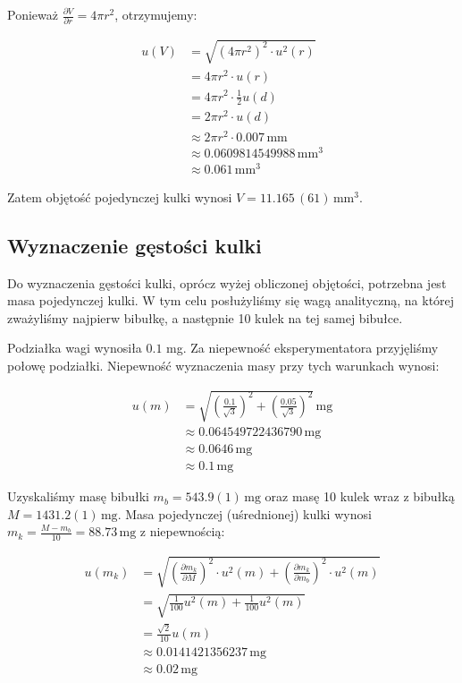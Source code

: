 \documentclass[a4paper]{article}
\begin{document}
Ponieważ $\frac{\partial V}{\partial r} = 4 \pi r^2$, otrzymujemy:

\begin{align*}
	u(V) &= \sqrt{\left(4 \pi r^2\right)^2 \cdot u^2(r)} \\
	&= 4 \pi r^2 \cdot u(r) \\
	&= 4 \pi r^2 \cdot \frac 1 2 u(d) \\
	&= 2 \pi r^2 \cdot u(d) \\
	&\approx 2 \pi r^2 \cdot 0.007 \, \text{mm} \\
	&\approx 0.0609814549988 \, \text{mm}^3 \\
	&\approx 0.061 \, \text{mm}^3
\end{align*}

Zatem objętość pojedynczej kulki wynosi $V = 11.165 \, (61) \, \text{mm}^3$.

\subsection{Wyznaczenie gęstości kulki}

Do wyznaczenia gęstości kulki, oprócz wyżej obliczonej objętości, potrzebna jest masa pojedynczej kulki.
W tym celu posłużyliśmy się wagą analityczną, na której zważyliśmy najpierw bibułkę, a następnie 10 kulek na tej samej bibułce.

Podziałka wagi wynosiła $0.1$ mg.
Za niepewność eksperymentatora przyjęliśmy połowę podziałki.
Niepewność wyznaczenia masy przy tych warunkach wynosi:

\begin{align*}
	u(m) &= \sqrt{\left(\frac{0.1}{\sqrt 3}\right)^2 + \left(\frac{0.05}{\sqrt 3}\right)^2} \, \text{mg} \\
	&\approx 0.064549722436790 \, \text{mg} \\
	&\approx 0.0646 \, \text{mg} \\
	&\approx 0.1 \, \text{mg}
\end{align*}

Uzyskaliśmy masę bibułki $m_b = 543.9 (1) \, \text{mg}$ oraz masę 10 kulek wraz z bibułką $M = 1431.2 (1) \, \text{mg}$.
Masa pojedynczej (uśrednionej) kulki wynosi $m_k = \frac{M-m_b}{10} = 88.73 \, \text{mg}$ z niepewnością:

\begin{align*}
	u(m_k) &= \sqrt{\left(\frac{\partial m_k}{\partial M}\right)^2 \cdot u^2(m) + \left(\frac{\partial m_k}{\partial m_b}\right)^2 \cdot u^2(m)} \\
	&= \sqrt{\frac{1}{100} u^2(m) + \frac{1}{100} u^2(m)} \\
	&= \frac{\sqrt 2}{10} u(m) \\
	&\approx 0.0141421356237 \, \text{mg} \\
	&\approx 0.02 \, \text{mg}
\end{align*}
\end{document}
